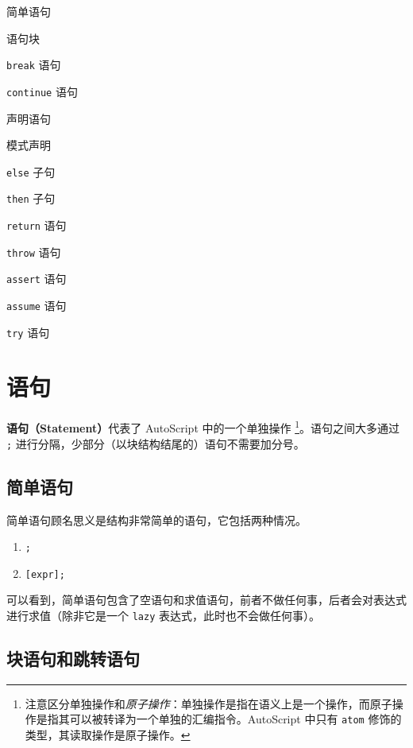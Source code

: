 \begin{introduction}
    \item 简单语句
    \item 语句块
    \item \lstinline!break! 语句
    \item \lstinline!continue! 语句
    \item 声明语句
    \item 模式声明
    \item \lstinline!else! 子句
    \item \lstinline!then! 子句
    \item \lstinline!return! 语句
    \item \lstinline!throw! 语句
    \item \lstinline!assert! 语句
    \item \lstinline!assume! 语句
    \item \lstinline!try! 语句
\end{introduction}

\section{语句}

\textbf{语句（Statement）}代表了 AutoScript 中的一个单独操作 \footnote{注意区分单独操作和\emph{原子操作}：单独操作是指在语义上是一个操作，而原子操作是指其可以被转译为一个单独的汇编指令。AutoScript 中只有 \lstinline!atom! 修饰的类型，其读取操作是原子操作。}。语句之间大多通过 \lstinline!;! 进行分隔，少部分（以块结构结尾的）语句不需要加分号。

\subsection{简单语句}

简单语句顾名思义是结构非常简单的语句，它包括两种情况。

\begin{grammar}[简单语句] \label{grm:simple-statement}
\begin{enumerate}
	\item \lstinline!;!
	\item \lstinline![expr];!
\end{enumerate}
\end{grammar}

可以看到，简单语句包含了空语句和求值语句，前者不做任何事，后者会对表达式进行求值（除非它是一个 \lstinline!lazy! 表达式，此时也不会做任何事）。

\subsection{块语句和跳转语句}

